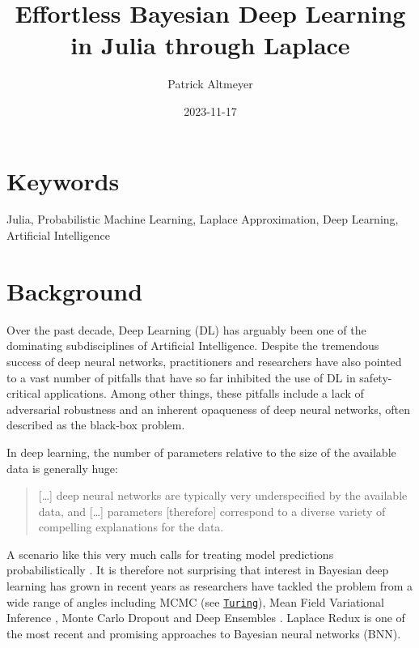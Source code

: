 \documentclass{juliacon}
\title{Effortless Bayesian Deep Learning in Julia through Laplace}
\author[1]{Patrick Altmeyer}
\affil[1]{Delft University of Technology}
\date{2023-11-17}
\providecommand{\JCONkeywords}[1]
{
  \small	
  \section*{Keywords} #1
}
\begin{document}
\maketitle


\JCONkeywords{Julia, Probabilistic Machine Learning, Laplace
Approximation, Deep Learning, Artificial Intelligence}


\setcounter{page}{1}

\ifdefined\Shaded\renewenvironment{Shaded}{\begin{tcolorbox}[frame hidden, enhanced, interior hidden, sharp corners, breakable, boxrule=0pt, borderline west={3pt}{0pt}{shadecolor}]}{\end{tcolorbox}}\fi

\hypertarget{sec-intro}{%
\section{Background}\label{sec-intro}}

Over the past decade, Deep Learning (DL) has arguably been one of the
dominating subdisciplines of Artificial Intelligence. Despite the
tremendous success of deep neural networks, practitioners and
researchers have also pointed to a vast number of pitfalls that have so
far inhibited the use of DL in safety-critical applications. Among other
things, these pitfalls include a lack of adversarial robustness
\citep{goodfellow2014explaining} and an inherent opaqueness of deep
neural networks, often described as the black-box problem.

In deep learning, the number of parameters relative to the size of the
available data is generally huge:

\begin{quote}
{[}\ldots{]} deep neural networks are typically very underspecified by
the available data, and {[}\ldots{]} parameters {[}therefore{]}
correspond to a diverse variety of compelling explanations for the data.
\citet{wilson2020case}
\end{quote}

A scenario like this very much calls for treating model predictions
probabilistically \citep{wilson2020case}. It is therefore not surprising
that interest in Bayesian deep learning has grown in recent years as
researchers have tackled the problem from a wide range of angles
including MCMC (see
\href{https://turing.ml/dev/tutorials/03-bayesian-neural-network/}{\texttt{Turing}}),
Mean Field Variational Inference \citep{blundell2015weight}, Monte Carlo
Dropout \citep{gal2016dropout} and Deep Ensembles
\citep{lakshminarayanan2016simple}. Laplace Redux
\citep[\citet{daxberger2021laplace}]{immer2020improving} is one of the
most recent and promising approaches to Bayesian neural networks (BNN).
\end{document}
